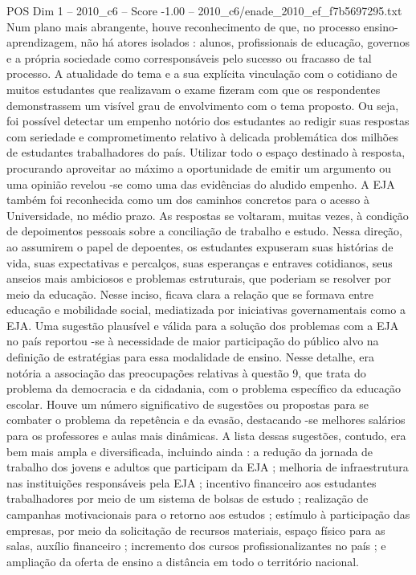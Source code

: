 \begin{textsample}{POS Dim 1 – 2010\_c6 – Score -1.00 – 2010\_c6/enade\_2010\_ef\_f7b5697295.txt}
Num plano mais abrangente, houve reconhecimento de que, no processo ensino-aprendizagem, não há atores isolados : alunos, profissionais de educação, governos e a própria sociedade como corresponsáveis pelo sucesso ou fracasso de tal processo.
A atualidade do tema e a sua explícita vinculação com o cotidiano de muitos estudantes que realizavam o exame fizeram com que os respondentes demonstrassem um visível grau de envolvimento com o tema proposto.
Ou seja, foi possível detectar um empenho notório dos estudantes ao redigir suas respostas com seriedade e comprometimento relativo à delicada problemática dos milhões de estudantes trabalhadores do país.
Utilizar todo o espaço destinado à resposta, procurando aproveitar ao máximo a oportunidade de emitir um argumento ou uma opinião revelou -se como uma das evidências do aludido empenho.
A EJA também foi reconhecida como um dos caminhos concretos para o acesso à Universidade, no médio prazo.
As respostas se voltaram, muitas vezes, à condição de depoimentos pessoais sobre a conciliação de trabalho e estudo.
Nessa direção, ao assumirem o papel de depoentes, os estudantes expuseram suas histórias de vida, suas expectativas e percalços, suas esperanças e entraves cotidianos, seus anseios mais ambiciosos e problemas estruturais, que poderiam se resolver por meio da educação.
Nesse inciso, ficava clara a relação que se formava entre educação e mobilidade social, mediatizada por iniciativas governamentais como a EJA.
Uma sugestão plausível e válida para a solução dos problemas com a EJA no país reportou -se à necessidade de maior participação do público alvo na definição de estratégias para essa modalidade de ensino.
Nesse detalhe, era notória a associação das preocupações relativas à questão 9, que trata do problema da democracia e da cidadania, com o problema específico da educação escolar.
Houve um número significativo de sugestões ou propostas para se combater o problema da repetência e da evasão, destacando -se melhores salários para os professores e aulas mais dinâmicas.
A lista dessas sugestões, contudo, era bem mais ampla e diversificada, incluindo ainda : a redução da jornada de trabalho dos jovens e adultos que participam da EJA ; melhoria de infraestrutura nas instituições responsáveis pela EJA ; incentivo financeiro aos estudantes trabalhadores por meio de um sistema de bolsas de estudo ; realização de campanhas motivacionais para o retorno aos estudos ; estímulo à participação das empresas, por meio da solicitação de recursos materiais, espaço físico para as salas, auxílio financeiro ; incremento dos cursos profissionalizantes no país ; e ampliação da oferta de ensino a distância em todo o território nacional.

\end{textsample}
